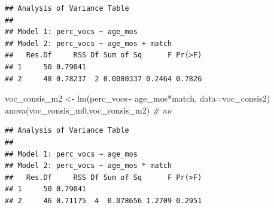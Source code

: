\documentclass[
]{article}
\newenvironment{Shaded}{\begin{snugshade}}{\end{snugshade}}
\newcommand{\AttributeTok}[1]{\textcolor[rgb]{0.77,0.63,0.00}{#1}}
\newcommand{\CommentTok}[1]{\textcolor[rgb]{0.56,0.35,0.01}{\textit{#1}}}
\newcommand{\FunctionTok}[1]{\textcolor[rgb]{0.00,0.00,0.00}{#1}}
\newcommand{\NormalTok}[1]{#1}
\newcommand{\OtherTok}[1]{\textcolor[rgb]{0.56,0.35,0.01}{#1}}
\newcommand{\SpecialCharTok}[1]{\textcolor[rgb]{0.00,0.00,0.00}{#1}}
\newcommand{\StringTok}[1]{\textcolor[rgb]{0.31,0.60,0.02}{#1}}
\begin{document}
\begin{Shaded}
\end{Shaded}

\begin{verbatim}
## Analysis of Variance Table
## 
## Model 1: perc_vocs ~ age_mos
## Model 2: perc_vocs ~ age_mos + match
##   Res.Df     RSS Df Sum of Sq      F Pr(>F)
## 1     50 0.79041                           
## 2     48 0.78237  2 0.0080337 0.2464 0.7826
\end{verbatim}

\begin{Shaded}
\begin{Highlighting}[]
\NormalTok{voc\_consis\_m2 }\OtherTok{\textless{}{-}} \FunctionTok{lm}\NormalTok{(perc\_vocs}\SpecialCharTok{\textasciitilde{}}\NormalTok{ age\_mos}\SpecialCharTok{*}\NormalTok{match, }\AttributeTok{data=}\NormalTok{voc\_consis2)}
\FunctionTok{anova}\NormalTok{(voc\_consis\_m0,voc\_consis\_m2) }\CommentTok{\# no}
\end{Highlighting}
\end{Shaded}

\begin{verbatim}
## Analysis of Variance Table
## 
## Model 1: perc_vocs ~ age_mos
## Model 2: perc_vocs ~ age_mos * match
##   Res.Df     RSS Df Sum of Sq      F Pr(>F)
## 1     50 0.79041                           
## 2     46 0.71175  4  0.078656 1.2709 0.2951
\end{verbatim}
\end{document}
